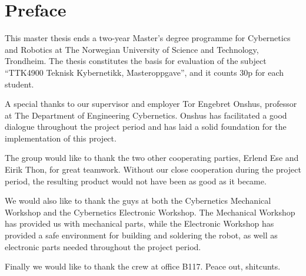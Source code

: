 \chapter*{Preface}

This master thesis ends a two-year Master's degree programme for Cybernetics and Robotics at The Norwegian University of Science and Technology, Trondheim. The thesis constitutes the basis for evaluation of the subject ``TTK4900 Teknisk Kybernetikk, Masteroppgave'', and it counts 30p for each student.

A special thanks to our supervisor and employer Tor Engebret Onshus, professor at The Department of Engineering Cybernetics. Onshus has facilitated a good dialogue throughout the project period and has laid a solid foundation for the implementation of this project.

The group would like to thank the two other cooperating parties, Erlend Ese and Eirik Thon, for great teamwork. Without our close cooperation during the project period, the resulting product would not have been as good as it became.

We would also like to thank the guys at both the Cybernetics Mechanical Workshop and the Cybernetics Electronic Workshop. The Mechanical Workshop has provided us with mechanical parts, while the Electronic Workshop has provided a safe environment for building and soldering the robot, as well as electronic parts needed throughout the project period.

Finally we would like to thank the crew at office B117. Peace out, shitcunts.